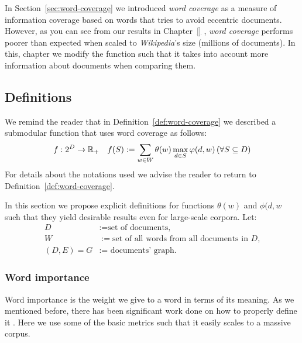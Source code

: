 In Section~\vref{sec:word-coverage} we introduced \emph{word coverage} as a
measure of information coverage based on words that tries to avoid eccentric
documents.
However, as you can see from our results in Chapter~\vref{} , \emph{word coverage} performs poorer than expected when scaled to
\emph{Wikipedia}'s size (millions of documents).
In this, chapter we modify the function such that it takes into account more
information about documents when comparing them.

\subsection{Definitions}

We remind the reader that in Definition~\vref{def:word-coverage} we described a
submodular function that uses word coverage as follows:
\begin{align*}
  &f : 2^D \to \mathbb{R}_+
  &f(S) := \sum_{w \in W} \theta(w) \max_{d \in S} \varphi(d, w)
  \,(\forall S \subseteq D)
\end{align*}
For details about the notations used we advise the reader to return to
Definition~\vref{def:word-coverage}.

In this section we propose explicit definitions for functions \(\theta(w)\) and
\(\phi(d, w\) such that they yield desirable results even for large-scale
corpora.
Let:
\begin{align*}
  D &:= \text{set of documents,} \\
  W &:= \text{set of all words from all documents in \(D\),} \\
  (D, E) = G &:= \text{ documents' graph.}
\end{align*}

\subsubsection{Word importance}

Word importance is the weight we give to a word in terms of its meaning. As we
mentioned before, there has been significant work done on how to properly
define it \cite{}. Here we use some of the basic metrics
such that it easily scales to a massive corpus.

